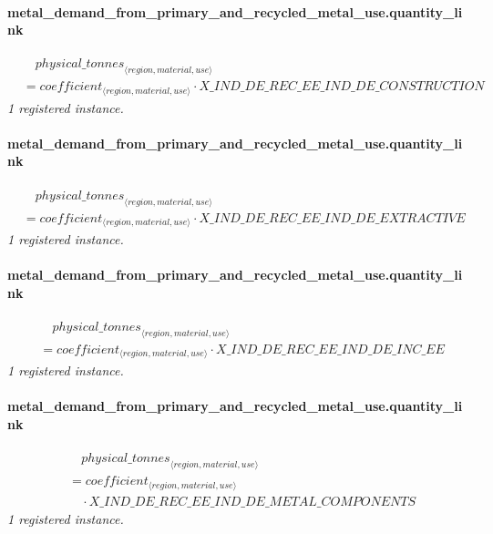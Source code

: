 \documentclass[11pt]{article}
\begin{document}
\paragraph{metal\_demand\_from\_primary\_and\_recycled\_metal\_use.quantity\_link}
\begin{align*}
&\quad {physical\_tonnes}_{\langle region, material, use\rangle}\\
&= coefficient_{\langle region, material, use\rangle} \cdot X\_IND\_DE\_REC\_EE\_IND\_DE\_CONSTRUCTION
\end{align*}
\noindent\emph{1 registered instance.}\par
\paragraph{metal\_demand\_from\_primary\_and\_recycled\_metal\_use.quantity\_link}
\begin{align*}
&\quad {physical\_tonnes}_{\langle region, material, use\rangle}\\
&= coefficient_{\langle region, material, use\rangle} \cdot X\_IND\_DE\_REC\_EE\_IND\_DE\_EXTRACTIVE
\end{align*}
\noindent\emph{1 registered instance.}\par
\paragraph{metal\_demand\_from\_primary\_and\_recycled\_metal\_use.quantity\_link}
\begin{align*}
&\quad {physical\_tonnes}_{\langle region, material, use\rangle}\\
&= coefficient_{\langle region, material, use\rangle} \cdot X\_IND\_DE\_REC\_EE\_IND\_DE\_INC\_EE
\end{align*}
\noindent\emph{1 registered instance.}\par
\paragraph{metal\_demand\_from\_primary\_and\_recycled\_metal\_use.quantity\_link}
\begin{align*}
&\quad {physical\_tonnes}_{\langle region, material, use\rangle}\\
&= coefficient_{\langle region, material, use\rangle}\\
&\quad {}\cdot X\_IND\_DE\_REC\_EE\_IND\_DE\_METAL\_COMPONENTS
\end{align*}
\noindent\emph{1 registered instance.}\par
\end{document}
